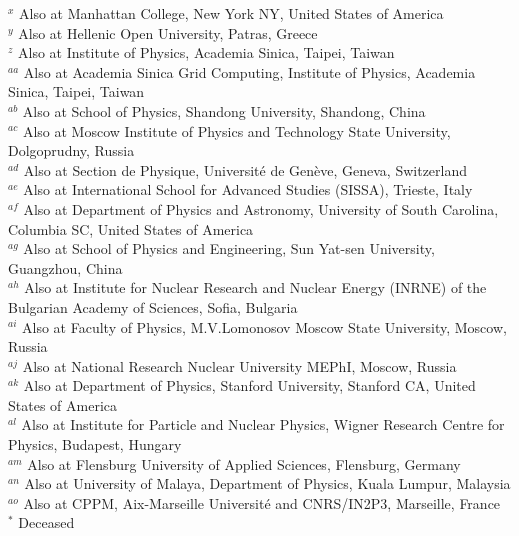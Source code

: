 \begin{flushleft}
$^{x}$ Also at Manhattan College, New York NY, United States of America\\
$^{y}$ Also at Hellenic Open University, Patras, Greece\\
$^{z}$ Also at Institute of Physics, Academia Sinica, Taipei, Taiwan\\
$^{aa}$ Also at Academia Sinica Grid Computing, Institute of Physics, Academia Sinica, Taipei, Taiwan\\
$^{ab}$ Also at School of Physics, Shandong University, Shandong, China\\
$^{ac}$ Also at Moscow Institute of Physics and Technology State University, Dolgoprudny, Russia\\
$^{ad}$ Also at Section de Physique, Universit{\'e} de Gen{\`e}ve, Geneva, Switzerland\\
$^{ae}$ Also at International School for Advanced Studies (SISSA), Trieste, Italy\\
$^{af}$ Also at Department of Physics and Astronomy, University of South Carolina, Columbia SC, United States of America\\
$^{ag}$ Also at School of Physics and Engineering, Sun Yat-sen University, Guangzhou, China\\
$^{ah}$ Also at Institute for Nuclear Research and Nuclear Energy (INRNE) of the Bulgarian Academy of Sciences, Sofia, Bulgaria\\
$^{ai}$ Also at Faculty of Physics, M.V.Lomonosov Moscow State University, Moscow, Russia\\
$^{aj}$ Also at National Research Nuclear University MEPhI, Moscow, Russia\\
$^{ak}$ Also at Department of Physics, Stanford University, Stanford CA, United States of America\\
$^{al}$ Also at Institute for Particle and Nuclear Physics, Wigner Research Centre for Physics, Budapest, Hungary\\
$^{am}$ Also at Flensburg University of Applied Sciences, Flensburg, Germany\\
$^{an}$ Also at University of Malaya, Department of Physics, Kuala Lumpur, Malaysia\\
$^{ao}$ Also at CPPM, Aix-Marseille Universit{\'e} and CNRS/IN2P3, Marseille, France\\
$^{*}$ Deceased
\end{flushleft}


